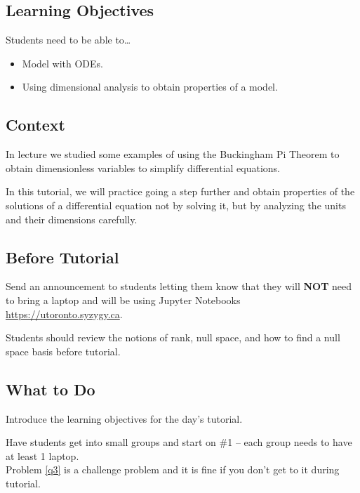 \subsection*{Learning Objectives}
	Students need to be able to\ldots
		\begin{itemize}\it 
			\item Model with ODEs. \\[-20pt]
			\item Using dimensional analysis to obtain properties of a model.
		\end{itemize}


%	
\subsection*{Context}
	
In lecture we studied some examples of using the Buckingham Pi Theorem to obtain dimensionless variables to simplify differential equations.

In this tutorial, we will practice going a step further and obtain properties of the solutions of a differential equation not by solving it, but by analyzing the units and their dimensions carefully.





\subsection*{Before Tutorial}

Send an announcement to students letting them know that they will \textbf{NOT} need to bring a laptop and will be using Jupyter Notebooks \url{https://utoronto.syzygy.ca}.

Students should review the notions of rank, null space, and how to find a null space basis before tutorial.


\subsection*{What to Do}
	
Introduce the learning objectives for the day's tutorial.

Have students get into small groups and start on \#1 -- each group needs to have at least 1 laptop. \\



Problem \ref{q3} is a challenge problem and it is fine if you don't get to it during tutorial.




%
	
	

	
	
